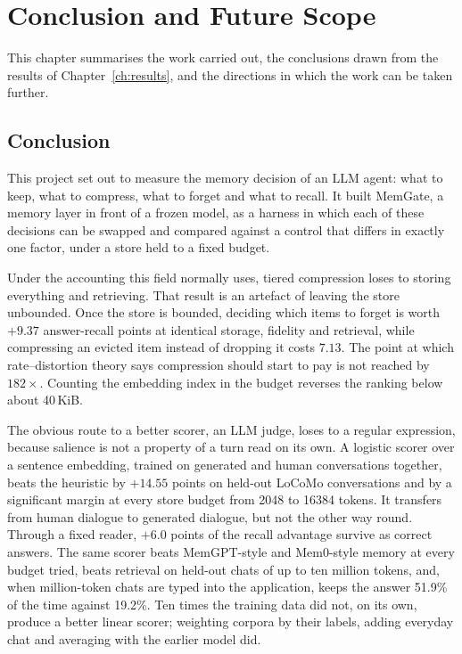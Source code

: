 \chapter{Conclusion and Future Scope}
\label{ch:concl}

This chapter summarises the work carried out, the conclusions drawn from the
results of Chapter~\ref{ch:results}, and the directions in which the work can
be taken further.

\section{Conclusion}

This project set out to measure the memory decision of an LLM agent: what to
keep, what to compress, what to forget and what to recall. It built MemGate, a
memory layer in front of a frozen model, as a harness in which each of these
decisions can be swapped and compared against a control that differs in
exactly one factor, under a store held to a fixed budget.

Under the accounting this field normally uses, tiered compression loses to
storing everything and retrieving. That result is an artefact of leaving the
store unbounded. Once the store is bounded, deciding which items to forget is
worth $+9.37$ answer-recall points at identical storage, fidelity and
retrieval, while compressing an evicted item instead of dropping it costs
$7.13$. The point at which rate--distortion theory says compression should
start to pay is not reached by $182\times$. Counting the embedding index in the
budget reverses the ranking below about 40\,KiB.

The obvious route to a better scorer, an LLM judge, loses to a regular
expression, because salience is not a property of a turn read on its own. A
logistic scorer over a sentence embedding, trained on generated and human
conversations together, beats the heuristic by $+14.55$ points on held-out
LoCoMo conversations and by a significant margin at every store budget from
2048 to 16384 tokens. It transfers from human dialogue to generated dialogue,
but not the other way round. Through a fixed reader, $+6.0$ points of the
recall advantage survive as correct answers. The same scorer beats
MemGPT-style and Mem0-style memory at every budget tried, beats retrieval on
held-out chats of up to ten million tokens, and, when million-token chats are
typed into the application, keeps the answer 51.9\% of the time against
19.2\%. Ten times the training data did not, on its own, produce a better
linear scorer; weighting corpora by their labels, adding everyday chat and
averaging with the earlier model did.

